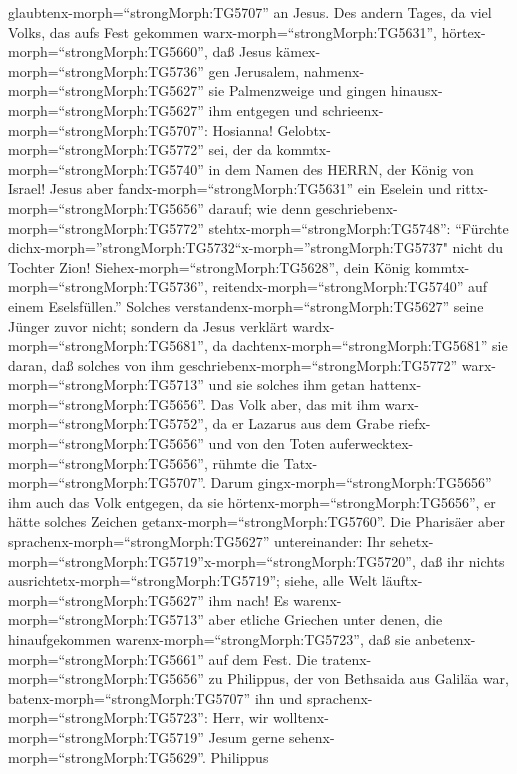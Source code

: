 glaubtenx-morph=``strongMorph:TG5707'' an Jesus.  Des
andern Tages, da viel Volks, das aufs Fest gekommen
warx-morph=``strongMorph:TG5631'', hörtex-morph=``strongMorph:TG5660'',
daß Jesus kämex-morph=``strongMorph:TG5736'' gen Jerusalem,
 nahmenx-morph=``strongMorph:TG5627'' sie Palmenzweige und
gingen hinausx-morph=``strongMorph:TG5627'' ihm entgegen und
schrieenx-morph=``strongMorph:TG5707'': Hosianna!
Gelobtx-morph=``strongMorph:TG5772'' sei, der da
kommtx-morph=``strongMorph:TG5740'' in dem Namen des HERRN, der König
von Israel!  Jesus aber fandx-morph=``strongMorph:TG5631''
ein Eselein und rittx-morph=``strongMorph:TG5656'' darauf; wie denn
geschriebenx-morph=``strongMorph:TG5772''
stehtx-morph=``strongMorph:TG5748'':  ``Fürchte
dichx-morph=''strongMorph:TG5732``\textbar x-morph=''strongMorph:TG5737"
nicht du Tochter Zion! Siehex-morph=``strongMorph:TG5628'', dein König
kommtx-morph=``strongMorph:TG5736'',
reitendx-morph=``strongMorph:TG5740'' auf einem Eselsfüllen.''
 Solches verstandenx-morph=``strongMorph:TG5627'' seine
Jünger zuvor nicht; sondern da Jesus verklärt
wardx-morph=``strongMorph:TG5681'', da
dachtenx-morph=``strongMorph:TG5681'' sie daran, daß solches von ihm
geschriebenx-morph=``strongMorph:TG5772''
warx-morph=``strongMorph:TG5713'' und sie solches ihm getan
hattenx-morph=``strongMorph:TG5656''.  Das Volk aber, das
mit ihm warx-morph=``strongMorph:TG5752'', da er Lazarus aus dem Grabe
riefx-morph=``strongMorph:TG5656'' und von den Toten
auferwecktex-morph=``strongMorph:TG5656'', rühmte die
Tatx-morph=``strongMorph:TG5707''.  Darum
gingx-morph=``strongMorph:TG5656'' ihm auch das Volk entgegen, da sie
hörtenx-morph=``strongMorph:TG5656'', er hätte solches Zeichen
getanx-morph=``strongMorph:TG5760''.  Die Pharisäer aber
sprachenx-morph=``strongMorph:TG5627'' untereinander: Ihr
sehetx-morph=``strongMorph:TG5719''\textbar x-morph=``strongMorph:TG5720'',
daß ihr nichts ausrichtetx-morph=``strongMorph:TG5719''; siehe, alle
Welt läuftx-morph=``strongMorph:TG5627'' ihm nach!  Es
warenx-morph=``strongMorph:TG5713'' aber etliche Griechen unter denen,
die hinaufgekommen warenx-morph=``strongMorph:TG5723'', daß sie
anbetenx-morph=``strongMorph:TG5661'' auf dem Fest.  Die
tratenx-morph=``strongMorph:TG5656'' zu Philippus, der von Bethsaida aus
Galiläa war, batenx-morph=``strongMorph:TG5707'' ihn und
sprachenx-morph=``strongMorph:TG5723'': Herr, wir
wolltenx-morph=``strongMorph:TG5719'' Jesum gerne
sehenx-morph=``strongMorph:TG5629''.  Philippus
